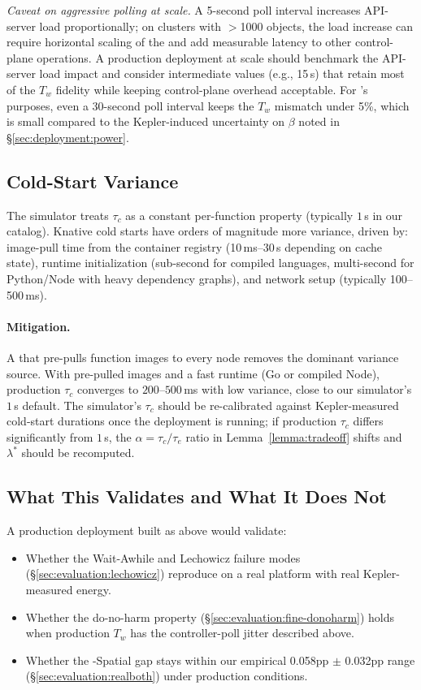 \emph{Caveat on aggressive polling at scale.} A 5-second poll
interval increases API-server load proportionally; on clusters with
$>$1000  objects, the load increase can require
horizontal scaling of the  and add measurable
latency to other control-plane operations. A production deployment
at scale should benchmark the API-server load impact and consider
intermediate values (e.g., 15\,s) that retain most of the $T_w$
fidelity while keeping control-plane overhead acceptable. For
\GreenFaaS{}'s purposes, even a 30-second poll interval keeps the
$T_w$ mismatch under 5\%, which is small compared to the
Kepler-induced uncertainty on $\beta$ noted in
\S\ref{sec:deployment:power}.

\subsection{Cold-Start Variance}
\label{sec:deployment:coldstart}

The simulator treats $\tau_c$ as a constant per-function property
(typically $1$\,s in our catalog). Knative cold starts have orders
of magnitude more variance, driven by: image-pull time from the
container registry (10\,ms--30\,s depending on cache state),
runtime initialization (sub-second for compiled languages,
multi-second for Python/Node with heavy dependency graphs), and
network setup (typically 100--500\,ms).

\paragraph{Mitigation.}
A  that pre-pulls function images to every node
removes the dominant variance source. With pre-pulled images and a
fast runtime (Go or compiled Node), production $\tau_c$ converges to
$200$--$500$\,ms with low variance, close to our simulator's
$1$\,s default. The simulator's $\tau_c$ should be re-calibrated
against Kepler-measured cold-start durations once the deployment is
running; if production $\tau_c$ differs significantly from $1$\,s,
the $\alpha = \tau_c / \tau_e$ ratio in Lemma~\ref{lemma:tradeoff}
shifts and $\lambda^*$ should be recomputed.

\subsection{What This Validates and What It Does Not}
\label{sec:deployment:validates}

A production deployment built as above would validate:
\begin{itemize}
\item Whether the Wait-Awhile and Lechowicz failure modes
(\S\ref{sec:evaluation:lechowicz}) reproduce on a real platform
with real Kepler-measured energy.
\item Whether the do-no-harm property
(\S\ref{sec:evaluation:fine-donoharm}) holds when production
$T_w$ has the controller-poll jitter described above.
\item Whether the \GreenFaaS{}-Spatial gap stays within our
empirical 0.058pp $\pm$ 0.032pp range
(\S\ref{sec:evaluation:realboth}) under production conditions.
\end{itemize}

